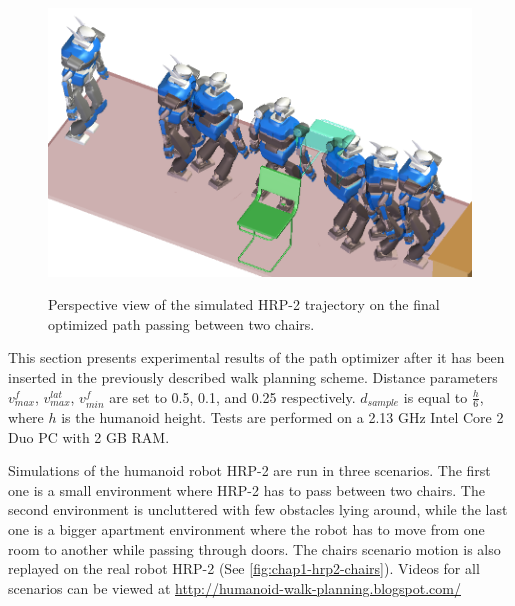 \begin{figure}
  \centering
      {\includegraphics[width = \linewidth]
        {src/chap1-path-optimization/chairs-hash-optim-perspective-hrp2.png}}
      \caption{Perspective view of the simulated HRP-2 trajectory on
        the final optimized path passing between two chairs.}
      \label{fig:chap1-chairs-hash-optim-perspective-hrp2}
\end{figure}

This section presents experimental results of the path
optimizer after it has been inserted in the previously described walk
planning scheme. Distance parameters $v_{max}^f$,
$v_{max}^{lat}$, $v_{min}^f$ are set to 0.5, 0.1, and 0.25
respectively. $d_{sample}$ is equal to $\frac{h}{6}$, where $h$
is the humanoid height.  Tests are performed on a 2.13 GHz Intel Core
2 Duo PC with 2 GB RAM.

Simulations of the humanoid robot HRP-2 are run in three scenarios.
The first one is a small environment where HRP-2 has to pass between
two chairs. The second environment is uncluttered with few obstacles
lying around, while the last one is a bigger apartment environment
where the robot has to move from one room to another while passing
through doors. The chairs scenario motion is also replayed on the real
robot HRP-2 (See \autoref{fig:chap1-hrp2-chairs}). Videos for all scenarios
can be viewed at \url{http://humanoid-walk-planning.blogspot.com/}


